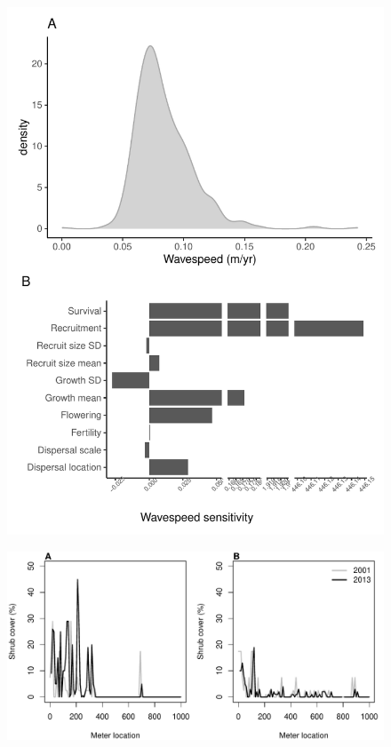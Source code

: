 \documentclass[11pt]{article}\usepackage[]{graphicx}\usepackage[usenames,dvipsnames]{xcolor}
\begin{document}
\newpage
\begin{figure}[H]
  \begin{center}
    \includegraphics[width=\linewidth]{Figures/wavespeed_sens}
  \caption{}
  \label{fig:wavespeed}
  \end{center}
\end{figure}

\newpage
\begin{figure}[H]
  \begin{center}
    \includegraphics[width=\linewidth]{Figures/resurveys}
  \caption{}
  \label{fig:resurvey}
  \end{center}
\end{figure}
\end{document}
